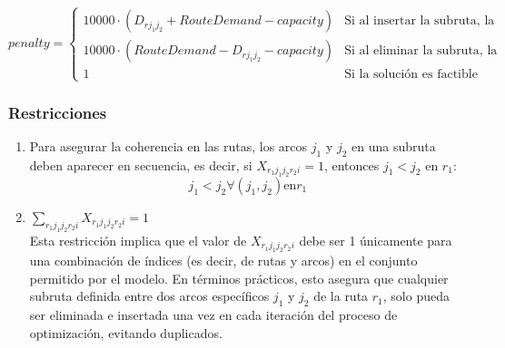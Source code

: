 \documentclass{article}
\begin{document}
\[
penalty = 
\begin{cases}
    10 000 \cdot  (D_{rj_1j_2} + RouteDemand - capacity) & \text{Si al insertar la subruta, la solución es infactible} \\
    10 000 \cdot (RouteDemand - D_{rj_1j_2} - capacity) & \text{Si al eliminar la subruta, la solución continua siendo infactible}\\
    1 & \text{Si la solución es factible} 
\end{cases}
\]

\subsubsection{Restricciones}


\begin{enumerate}
\item {Para asegurar la coherencia en las rutas, los arcos $j_1$ y $j_2$ en una subruta deben aparecer en secuencia, es decir, si $X_{r_1j_1j_2r_2i}=1$, entonces $j_1 < j_2$ en $r_1$:}
\[
j_1 < j_2 \forall (j_1,j_2) \text{en} r_1
\]

\item{$ \sum \limits_{r_1j_1j_2r_2i} X_{{r_1}{j_1}{j_2}{r_2}{i}} = 1 $}\\
Esta restricción implica que el valor de $X_{{r_1}{j_1}{j_2}{r_2}{i}}$ debe ser 1 únicamente para una combinación de índices (es decir, de rutas y arcos) en el conjunto permitido por el modelo. En términos prácticos, esto asegura que cualquier subruta definida entre dos arcos específicos $j_1$ y $j_2$ de la ruta $r_1$, solo pueda ser eliminada e insertada una vez en cada iteración del proceso de optimización, evitando duplicados.
\end{enumerate}


 
\end{document}

